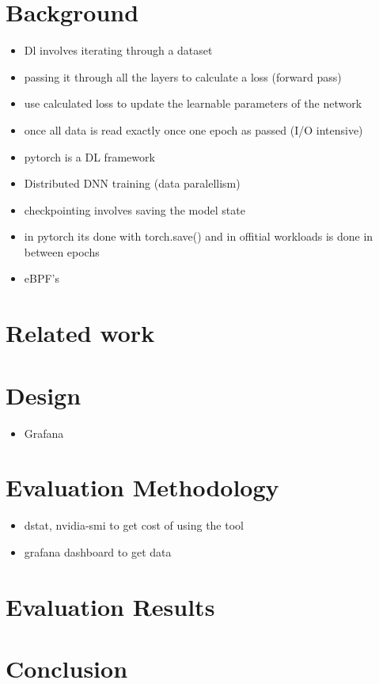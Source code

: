 \documentclass[conference]{IEEEtran}
\begin{document}
\section{Background}

\begin{itemize}
    \item Dl involves iterating through a dataset
    \item passing it through all the layers to calculate a loss (forward pass)
    \item use calculated loss to update the learnable parameters of the network
    \item once all data is read exactly once one epoch as passed (I/O intensive)
    \item pytorch is a DL framework
    \item Distributed DNN training (data paralellism)
    \item checkpointing involves saving the model state
    \item in pytorch its done with torch.save() and in offitial workloads is done in between epochs
    \item eBPF's
\end{itemize}

\section{Related work}

\section{Design}

\begin{itemize}
    \item Grafana
\end{itemize}

\section{Evaluation Methodology}

\begin{itemize}
    \item dstat, nvidia-smi to get cost of using the tool
    \item grafana dashboard to get data 
\end{itemize}

\section{Evaluation Results}

\section{Conclusion}
\end{document}
